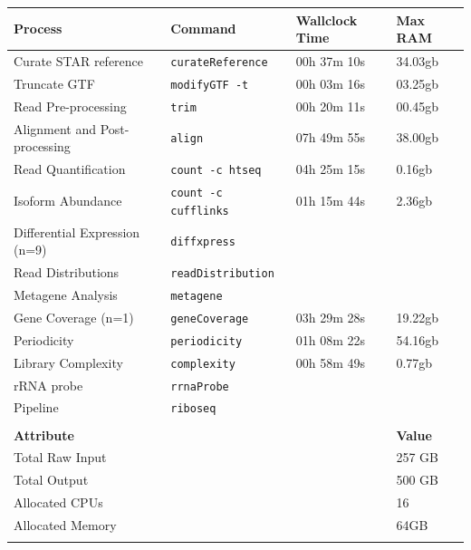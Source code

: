 \documentclass[10pt, oneside]{article}
\begin{document}
\begin{table}[h]
    \centering
{}
\begin{tabular}{p{5cm}p{3.5cm}p{2.7cm}p{1.8cm}}
\textbf{Process} & \textbf{Command} & \textbf{Wallclock Time} & \textbf{Max RAM}\\
  \hline
  Curate STAR reference & \texttt{curateReference} & 00h 37m 10s & 34.03gb \\
  \hline
  Truncate GTF & \texttt{modifyGTF -t} & 00h 03m 16s & 03.25gb \\
  \hline
  Read Pre-processing & \texttt{trim} & 00h 20m 11s & 00.45gb \\
  \hline
  Alignment and Post-processing & \texttt{align} & 07h 49m 55s & 38.00gb \\
  \hline
  Read Quantification & \texttt{count -c htseq} & 04h 25m 15s & 0.16gb \\
  \hline
  Isoform Abundance & \texttt{count -c cufflinks} & 01h 15m 44s & 2.36gb \\
  \hline
  Differential Expression (n=9) & \texttt{diffxpress} &  & \\
  \hline
  Read Distributions & \texttt{readDistribution} &  & \\
  \hline
  Metagene Analysis & \texttt{metagene} &  & \\
  \hline
  Gene Coverage (n=1) & \texttt{geneCoverage} & 03h 29m 28s & 19.22gb \\
  \hline
  Periodicity & \texttt{periodicity} & 01h 08m 22s & 54.16gb \\
  \hline
  Library Complexity & \texttt{complexity} & 00h 58m 49s & 0.77gb \\
  \hline
  rRNA probe & \texttt{rrnaProbe} &  & \\
  \hline
  Pipeline & \texttt{riboseq} & & \\
  \hline
  & & & \\
  \hline
  \hline
  \textbf{Attribute} & & & \textbf{Value}\\
  \hline
  Total Raw Input & & & 257 GB \\
  \hline
  Total Output & & & 500 GB \\
  \hline
  Allocated CPUs & & & 16 \\
  \hline
  Allocated Memory & & & 64GB \\
 \label{tab:chpc_performance}
\end{tabular}
\end{table}
\end{document}
